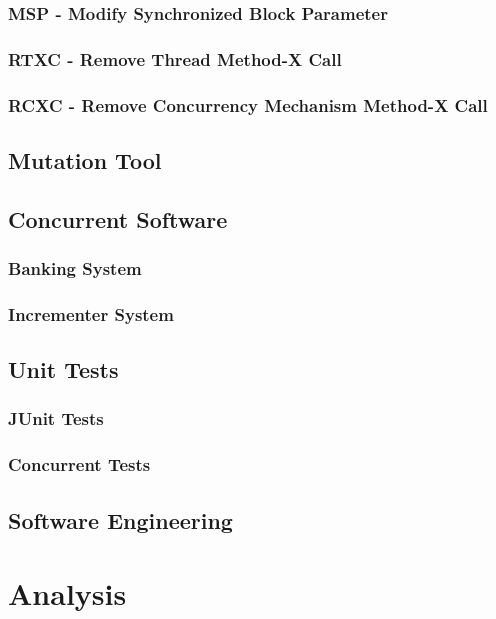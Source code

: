 \documentclass[a4paper,12pt]{article}
\begin{document}
\subsubsection{MSP - Modify Synchronized Block Parameter}
	
	

\subsubsection{RTXC - Remove Thread Method-X Call}


\subsubsection{RCXC - Remove Concurrency Mechanism Method-X Call}
	
	
	\subsection{Mutation Tool}
	\subsection{Concurrent Software}
	    \subsubsection{Banking System}
	    \subsubsection{Incrementer System}
	\subsection{Unit Tests}
	    \subsubsection{JUnit Tests}
	    \subsubsection{Concurrent Tests}
    \subsection{Software Engineering}
	
	
\newpage	
\section{Analysis}
\end{document}
